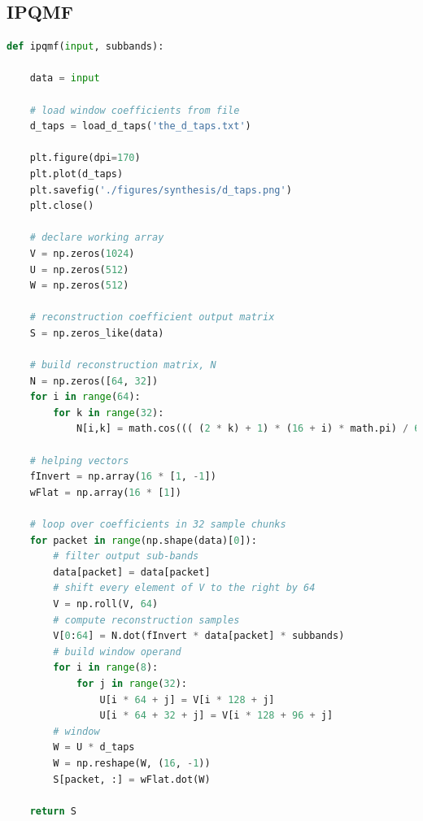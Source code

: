 \documentclass[11pt,a4paper]{article}
\begin{document}
\subsection{IPQMF}
\begin{lstlisting}[language=Python]
def ipqmf(input, subbands):

    data = input

    # load window coefficients from file
    d_taps = load_d_taps('the_d_taps.txt')

    plt.figure(dpi=170)
    plt.plot(d_taps)
    plt.savefig('./figures/synthesis/d_taps.png')
    plt.close()

    # declare working array
    V = np.zeros(1024)
    U = np.zeros(512)
    W = np.zeros(512)

    # reconstruction coefficient output matrix
    S = np.zeros_like(data)

    # build reconstruction matrix, N
    N = np.zeros([64, 32])
    for i in range(64):
        for k in range(32):
            N[i,k] = math.cos((( (2 * k) + 1) * (16 + i) * math.pi) / 64)

    # helping vectors
    fInvert = np.array(16 * [1, -1])
    wFlat = np.array(16 * [1])

    # loop over coefficients in 32 sample chunks
    for packet in range(np.shape(data)[0]):
        # filter output sub-bands
        data[packet] = data[packet]
        # shift every element of V to the right by 64
        V = np.roll(V, 64)
        # compute reconstruction samples
        V[0:64] = N.dot(fInvert * data[packet] * subbands)
        # build window operand
        for i in range(8):
            for j in range(32):
                U[i * 64 + j] = V[i * 128 + j]
                U[i * 64 + 32 + j] = V[i * 128 + 96 + j]
        # window
        W = U * d_taps
        W = np.reshape(W, (16, -1))
        S[packet, :] = wFlat.dot(W)

    return S
\end{lstlisting}

\pagebreak
\end{document}

